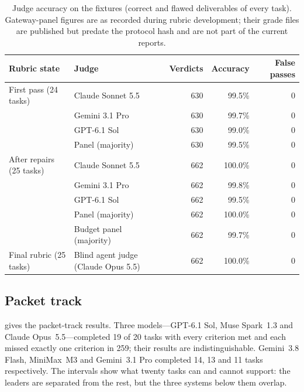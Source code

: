 \documentclass[11pt,a4paper]{article}
\begin{document}
\begin{table}[h]
\centering
\small
\caption{Judge accuracy on the fixtures (correct and flawed deliverables of every task). Gateway-panel figures are as recorded during rubric development; their grade files are published but predate the protocol hash and are not part of the current reports.}
\label{tab:calibration}
\begin{tabular}{@{}llrrr@{}}
\toprule
\textbf{Rubric state} & \textbf{Judge} & \textbf{Verdicts} & \textbf{Accuracy} & \textbf{False passes} \\
\midrule
First pass (24 tasks) & Claude Sonnet 5.5 & 630 & 99.5\% & 0 \\
 & Gemini 3.1 Pro & 630 & 99.7\% & 0 \\
 & GPT-6.1 Sol & 630 & 99.0\% & 0 \\
 & Panel (majority) & 630 & 99.5\% & 0 \\
\midrule
After repairs (25 tasks) & Claude Sonnet 5.5 & 662 & 100.0\% & 0 \\
 & Gemini 3.1 Pro & 662 & 99.8\% & 0 \\
 & GPT-6.1 Sol & 662 & 99.5\% & 0 \\
 & Panel (majority) & 662 & 100.0\% & 0 \\
 & Budget panel (majority) & 662 & 99.7\% & 0 \\
\midrule
Final rubric (25 tasks) & Blind agent judge (Claude Opus 5.5) & 662 & 100.0\% & 0 \\
\bottomrule
\end{tabular}
\end{table}

\subsection{Packet track}

 gives the packet-track results. Three models---GPT-6.1 Sol, Muse Spark~1.3 and Claude Opus~5.5---completed 19 of 20 tasks with every criterion met and each missed exactly one criterion in 259; their results are indistinguishable. Gemini~3.8 Flash, MiniMax~M3 and Gemini~3.1 Pro completed 14, 13 and 11 tasks respectively. The intervals show what twenty tasks can and cannot support: the leaders are separated from the rest, but the three systems below them overlap.
\end{document}
